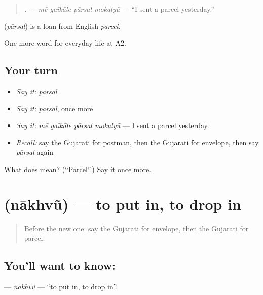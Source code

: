 \begin{quote}
\textbf{   .} — \emph{mẽ gaīkāle pārsal mokalyũ} — \textquotedblleft{}I sent a parcel yesterday.\textquotedblright{}
\end{quote}

\begin{cousinweb}
\textbf{} (\emph{pārsal}) is a loan from English \emph{parcel}.
\end{cousinweb}

\begin{grammarlens}[title={What you've built}]
One more word for everyday life at A2.
\end{grammarlens}

\subsection*{Your turn}
\begin{itemize}
\raggedright
  \item \emph{Say it:} \emph{pārsal}
  \item \emph{Say it:} \emph{pārsal}, once more
  \item \emph{Say it:} \emph{mẽ gaīkāle pārsal mokalyũ} — I sent a parcel yesterday.
  \item \emph{Recall:} say the Gujarati for postman, then the Gujarati for envelope, then say \emph{pārsal} again
\end{itemize}

\begin{tcolorbox}[breakable,colback=teal!4,colframe=teal!35!black,title={Before you move on}]
What does  mean? (\textquotedblleft{}Parcel\textquotedblright{}.) Say it once more.
\end{tcolorbox}
\section[\texorpdfstring{\gu{નાખવું} (nākhvũ)}{નાખવું (nākhvũ)}]{ (nākhvũ) — to put in, to drop in}

\label{lesson:GU-C200-nakhvu}



\begin{quote}
Before the new one: say the Gujarati for envelope, then the Gujarati for parcel.
\end{quote}

\subsection*{You'll want to know: }
\textbf{} — \emph{nākhvũ} — \textquotedblleft{}to put in, to drop in\textquotedblright{}.

